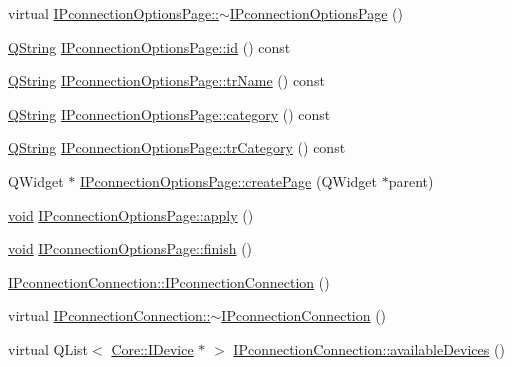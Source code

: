 \begin{DoxyCompactItemize}
\item 
virtual \hyperlink{group___i_p_conn_plugin_ga3b3b7d2dfd99db070bc9e3bebfaee3aa}{\-I\-Pconnection\-Options\-Page\-::$\sim$\-I\-Pconnection\-Options\-Page} ()
\item 
\hyperlink{group___u_a_v_objects_plugin_gab9d252f49c333c94a72f97ce3105a32d}{\-Q\-String} \hyperlink{group___i_p_conn_plugin_ga4e312ba72e8ed237e148f6f2fd3bfd3f}{\-I\-Pconnection\-Options\-Page\-::id} () const 
\item 
\hyperlink{group___u_a_v_objects_plugin_gab9d252f49c333c94a72f97ce3105a32d}{\-Q\-String} \hyperlink{group___i_p_conn_plugin_gaf5ef5d6b22e3098d76849cf94feeb35c}{\-I\-Pconnection\-Options\-Page\-::tr\-Name} () const 
\item 
\hyperlink{group___u_a_v_objects_plugin_gab9d252f49c333c94a72f97ce3105a32d}{\-Q\-String} \hyperlink{group___i_p_conn_plugin_ga74c9ab9f46cce418606d0ee3fc3491a0}{\-I\-Pconnection\-Options\-Page\-::category} () const 
\item 
\hyperlink{group___u_a_v_objects_plugin_gab9d252f49c333c94a72f97ce3105a32d}{\-Q\-String} \hyperlink{group___i_p_conn_plugin_gace8ed46c336f3ee28ed2afeae6088da2}{\-I\-Pconnection\-Options\-Page\-::tr\-Category} () const 
\item 
\-Q\-Widget $\ast$ \hyperlink{group___i_p_conn_plugin_gabfa6c9961024b87e52e12a8e7145e4f6}{\-I\-Pconnection\-Options\-Page\-::create\-Page} (\-Q\-Widget $\ast$parent)
\item 
\hyperlink{group___u_a_v_objects_plugin_ga444cf2ff3f0ecbe028adce838d373f5c}{void} \hyperlink{group___i_p_conn_plugin_gab7a01d955726b8a348fd5b7ee7ed1406}{\-I\-Pconnection\-Options\-Page\-::apply} ()
\item 
\hyperlink{group___u_a_v_objects_plugin_ga444cf2ff3f0ecbe028adce838d373f5c}{void} \hyperlink{group___i_p_conn_plugin_gad905bf02420acad58a684461d456bd09}{\-I\-Pconnection\-Options\-Page\-::finish} ()
\item 
\hyperlink{group___i_p_conn_plugin_ga5eedabe97b32eaee1617cc040476a4b9}{\-I\-Pconnection\-Connection\-::\-I\-Pconnection\-Connection} ()
\item 
virtual \hyperlink{group___i_p_conn_plugin_ga003fc5feae8a88f8a1ad994b5b688f6e}{\-I\-Pconnection\-Connection\-::$\sim$\-I\-Pconnection\-Connection} ()
\item 
virtual \-Q\-List$<$ \hyperlink{class_core_1_1_i_device}{\-Core\-::\-I\-Device} $\ast$ $>$ \hyperlink{group___i_p_conn_plugin_ga046ba69036aa4661e97da3c8fbb13850}{\-I\-Pconnection\-Connection\-::available\-Devices} ()
\item 

\end{DoxyCompactItemize}
